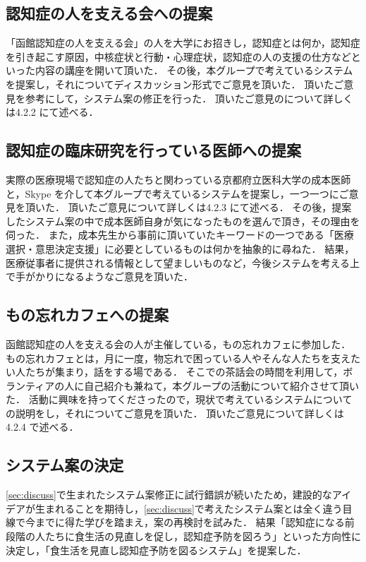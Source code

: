 \documentclass[../report]{subfiles}
\begin{document}
\begin{itemize}
\subsection{認知症の人を支える会への提案}
「函館認知症の人を支える会」の人を大学にお招きし，認知症とは何か，認知症を引き起こす原因，中核症状と行動・心理症状，認知症の人の支援の仕方などといった内容の講座を開いて頂いた．
その後，本グループで考えているシステムを提案し，それについてディスカッション形式でご意見を頂いた．
頂いたご意見を参考にして，システム案の修正を行った．
頂いたご意見のについて詳しくは4.2.2 にて述べる．

\subsection{認知症の臨床研究を行っている医師への提案}
実際の医療現場で認知症の人たちと関わっている京都府立医科大学の成本医師と，Skype を介して本グループで考えているシステムを提案し，一つ一つにご意見を頂いた．
頂いたご意見について詳しくは4.2.3 にて述べる．
その後，提案したシステム案の中で成本医師自身が気になったものを選んで頂き，その理由を伺った．
また，成本先生から事前に頂いていたキーワードの一つである「医療選択・意思決定支援」に必要としているものは何かを抽象的に尋ねた．
結果，医療従事者に提供される情報として望ましいものなど，今後システムを考える上で手がかりになるようなご意見を頂いた．

\subsection{もの忘れカフェへの提案} \label{sec:propose_cafe}
函館認知症の人を支える会の人が主催している，もの忘れカフェに参加した．
もの忘れカフェとは，月に一度，物忘れで困っている人やそんな人たちを支えたい人たちが集まり，話をする場である．
そこでの茶話会の時間を利用して，ボランティアの人に自己紹介も兼ねて，本グループの活動について紹介させて頂いた．
活動に興味を持ってくださったので，現状で考えているシステムについての説明をし，それについてご意見を頂いた．
頂いたご意見について詳しくは4.2.4 で述べる．

\subsection{システム案の決定} \label{sec:decision}
\ref{sec:discuss}で生まれたシステム案修正に試行錯誤が続いたため，建設的なアイデアが生まれることを期待し，\ref{sec:discuss}で考えたシステム案とは全く違う目線で今までに得た学びを踏まえ，案の再検討を試みた．
結果「認知症になる前段階の人たちに食生活の見直しを促し，認知症予防を図ろう」といった方向性に決定し，「食生活を見直し認知症予防を図るシステム」を提案した．


\end{itemize}
\end{document}

